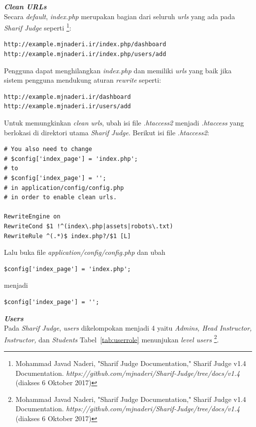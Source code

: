 \documentclass[a4paper,twoside]{article}
\begin{document}
\begin{enumerate}
\begin{enumerate}
			\textbf{\textit{Clean URLs}} \\
			Secara \textit{default}, \textit{index.php} merupakan bagian dari seluruh \textit{urls} yang ada pada \textit{Sharif Judge} seperti \footnote{Mohammad Javad Naderi, "Sharif Judge Documentation," Sharif Judge v1.4 Documentation. \textit{https://github.com/mjnaderi/Sharif-Judge/tree/docs/v1.4} (diakses 6 Oktober 2017)}: 
			\begin{lstlisting}[backgroundcolor = \color{lightgray}]
http://example.mjnaderi.ir/index.php/dashboard
http://example.mjnaderi.ir/index.php/users/add			
			\end{lstlisting}
			Pengguna dapat menghilangkan \textit{index.php} dan memiliki \textit{urls} yang baik jika sistem pengguna mendukung aturan \textit{rewrite} seperti:  
			\begin{lstlisting}[backgroundcolor = \color{lightgray}]
http://example.mjnaderi.ir/dashboard
http://example.mjnaderi.ir/users/add			
			\end{lstlisting}
			
			Untuk memungkinkan \textit{clean urls}, ubah isi file \textit{.htaccess2} menjadi \textit{.htaccess} yang berlokasi di direktori utama \textit{Sharif Judge}.
			Berikut isi file \textit{.htaccess2}: 
			\begin{lstlisting}[backgroundcolor = \color{lightgray}]
# You also need to change 
# $config['index_page'] = 'index.php';
# to
# $config['index_page'] = '';
# in application/config/config.php
# in order to enable clean urls.

RewriteEngine on
RewriteCond $1 !^(index\.php|assets|robots\.txt)
RewriteRule ^(.*)$ index.php?/$1 [L]			
			\end{lstlisting}
			Lalu buka file \textit{application/config/config.php} dan ubah  
			\begin{lstlisting}[backgroundcolor = \color{lightgray}]
$config['index_page'] = 'index.php';			
			\end{lstlisting}
			menjadi
			\begin{lstlisting}[backgroundcolor = \color{lightgray}]
$config['index_page'] = '';			
			\end{lstlisting}
			
			\textbf{\textit{Users}} \\
			Pada \textit{Sharif Judge}, \textit{users} dikelompokan menjadi 4 yaitu \textit{Admins, Head Instructor, Instructor, }dan \textit{Students}
			Tabel~\ref{tab:userrole} menunjukan \textit{level users} \footnote{Mohammad Javad Naderi, "Sharif Judge Documentation," Sharif Judge v1.4 Documentation. \textit{https://github.com/mjnaderi/Sharif-Judge/tree/docs/v1.4} (diakses 6 Oktober 2017)}.
			

\end{enumerate}
\end{enumerate}
\end{document}
